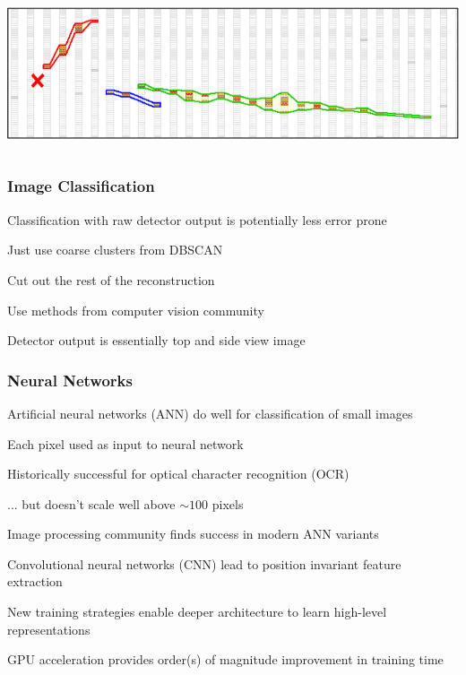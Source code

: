 \documentclass[10pt,professionalfonts,xcolor=table]{beamer}
\begin{document}
\begin{frame}
\begin{columns}[c]
\includegraphics[width=\textwidth]{figures/evd_steps/prongs.png}

\end{columns}


\end{frame}

\begin{frame}
\frametitle{Image Classification}
  \bangon
  \item Classification with raw detector output is potentially less error prone
  \bangon
  \item Just use coarse clusters from DBSCAN
  \item Cut out the rest of the reconstruction
  \bangoff
  \gap
  \item Use methods from computer vision community
  \bangon
  \item Detector output is essentially top and side view image
  \bangoff
  \bangoff
\end{frame}

\begin{frame}
\frametitle{Neural Networks}
  \bangon
  \bang Artificial neural networks (ANN) do well for classification of small images
    \bangon
    \item Each pixel used as input to neural network
    \item Historically successful for optical character recognition (OCR)
    \item[] ... but doesn't scale well above $\sim 100$ pixels
    \bangoff
  \gap
  \item Image processing community finds success in modern ANN variants
    \bangon
    \item Convolutional neural networks (CNN) lead to position invariant feature extraction
    \item New training strategies enable deeper architecture to learn high-level representations
    \item GPU acceleration provides order(s) of magnitude improvement in training time
    \bangoff
  \bangoff

\end{frame}
\end{document}
